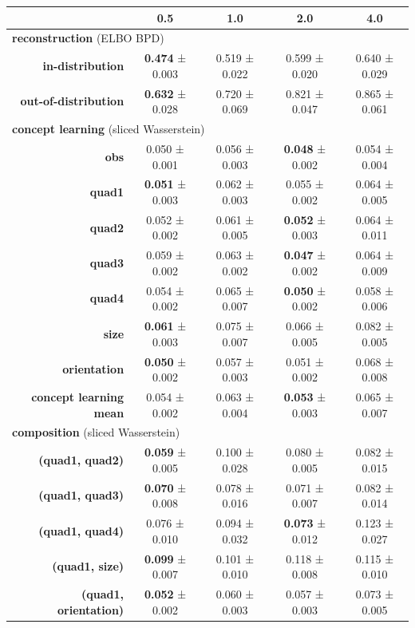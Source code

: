 \begin{tabular}{rcccc}
\toprule
& \textbf{0.5} & \textbf{1.0} & \textbf{2.0} & \textbf{4.0} \\
\midrule
\multicolumn{ 5 }{l}{\textbf{reconstruction}  (ELBO BPD)} \\
\midrule
\textbf{in-distribution} & \textbf{0.474} ± 0.003 & 0.519 ± 0.022 & 0.599 ± 0.020 & 0.640 ± 0.029 \\
\textbf{out-of-distribution} & \textbf{0.632} ± 0.028 & 0.720 ± 0.069 & 0.821 ± 0.047 & 0.865 ± 0.061 \\
\midrule
\multicolumn{ 5 }{l}{\textbf{concept learning}  (sliced Wasserstein)} \\
\midrule
\textbf{obs} & 0.050 ± 0.001 & 0.056 ± 0.003 & \textbf{0.048} ± 0.002 & 0.054 ± 0.004 \\
\textbf{quad1} & \textbf{0.051} ± 0.003 & 0.062 ± 0.003 & 0.055 ± 0.002 & 0.064 ± 0.005 \\
\textbf{quad2} & 0.052 ± 0.002 & 0.061 ± 0.005 & \textbf{0.052} ± 0.003 & 0.064 ± 0.011 \\
\textbf{quad3} & 0.059 ± 0.002 & 0.063 ± 0.002 & \textbf{0.047} ± 0.002 & 0.064 ± 0.009 \\
\textbf{quad4} & 0.054 ± 0.002 & 0.065 ± 0.007 & \textbf{0.050} ± 0.002 & 0.058 ± 0.006 \\
\textbf{size} & \textbf{0.061} ± 0.003 & 0.075 ± 0.007 & 0.066 ± 0.005 & 0.082 ± 0.005 \\
\textbf{orientation} & \textbf{0.050} ± 0.002 & 0.057 ± 0.003 & 0.051 ± 0.002 & 0.068 ± 0.008 \\
\addlinespace
\textbf{concept learning mean} & 0.054 ± 0.002 & 0.063 ± 0.004 & \textbf{0.053} ± 0.003 & 0.065 ± 0.007 \\
\midrule
\multicolumn{ 5 }{l}{\textbf{composition}  (sliced Wasserstein)} \\
\midrule
\textbf{(quad1, quad2)} & \textbf{0.059} ± 0.005 & 0.100 ± 0.028 & 0.080 ± 0.005 & 0.082 ± 0.015 \\
\textbf{(quad1, quad3)} & \textbf{0.070} ± 0.008 & 0.078 ± 0.016 & 0.071 ± 0.007 & 0.082 ± 0.014 \\
\textbf{(quad1, quad4)} & 0.076 ± 0.010 & 0.094 ± 0.032 & \textbf{0.073} ± 0.012 & 0.123 ± 0.027 \\
\textbf{(quad1, size)} & \textbf{0.099} ± 0.007 & 0.101 ± 0.010 & 0.118 ± 0.008 & 0.115 ± 0.010 \\
\textbf{(quad1, orientation)} & \textbf{0.052} ± 0.002 & 0.060 ± 0.003 & 0.057 ± 0.003 & 0.073 ± 0.005 \\

\end{tabular}
